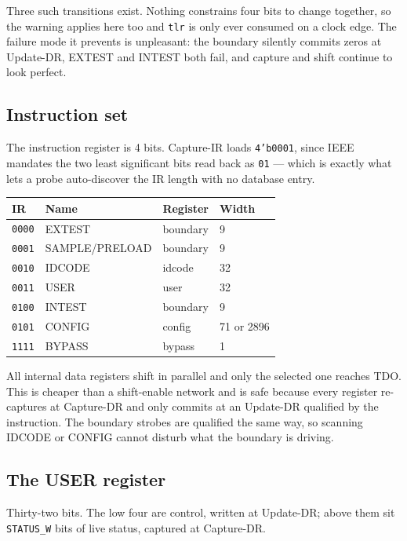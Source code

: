 \documentclass[11pt,a4paper]{article}
\newcommand{\sig}[1]{\texttt{#1}}
\begin{document}
Three such transitions exist. Nothing constrains four bits to change together,
so the warning applies here too and \sig{tlr} is only ever consumed on a clock
edge. The failure mode it prevents is unpleasant: the boundary silently commits
zeros at Update-DR, EXTEST and INTEST both fail, and capture and shift continue
to look perfect.

\subsection{Instruction set}

The instruction register is 4 bits. Capture-IR loads \texttt{4'b0001}, since
IEEE mandates the two least significant bits read back as \texttt{01} --- which
is exactly what lets a probe auto-discover the IR length with no database entry.

\begin{center}
\begin{tabular}{llll}
\toprule
\textbf{IR} & \textbf{Name} & \textbf{Register} & \textbf{Width} \\
\midrule
\texttt{0000} & EXTEST         & boundary & 9 \\
\texttt{0001} & SAMPLE/PRELOAD & boundary & 9 \\
\texttt{0010} & IDCODE         & idcode   & 32 \\
\texttt{0011} & USER           & user     & 32 \\
\texttt{0100} & INTEST         & boundary & 9 \\
\texttt{0101} & CONFIG         & config   & 71 or 2896 \\
\texttt{1111} & BYPASS         & bypass   & 1 \\
\bottomrule
\end{tabular}
\end{center}

All internal data registers shift in parallel and only the selected one reaches
TDO. This is cheaper than a shift-enable network and is safe because every
register re-captures at Capture-DR and only commits at an Update-DR qualified by
the instruction. The boundary strobes are qualified the same way, so scanning
IDCODE or CONFIG cannot disturb what the boundary is driving.

\subsection{The USER register}

Thirty-two bits. The low four are control, written at Update-DR; above them sit
\texttt{STATUS\_W} bits of live status, captured at Capture-DR.
\end{document}
